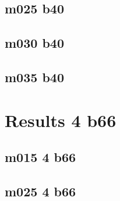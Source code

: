 \documentclass[pdftex,letterpaper,10pt]{article}
\begin{document}


\clearpage \subsection{m025 b40}



\clearpage \subsection{m030 b40}



\clearpage \subsection{m035 b40}



\clearpage \section{Results 4 b66}

\subsection{m015 4 b66}



\clearpage \subsection{m025 4 b66}




\clearpage
\end{document}
